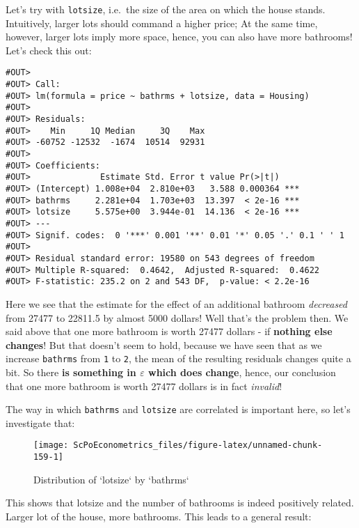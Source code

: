 \documentclass[]{book}
\begin{document}
Let's try with \texttt{lotsize}, i.e.~the size of the area on which the
house stands. Intuitively, larger lots should command a higher price; At
the same time, however, larger lots imply more space, hence, you can
also have more bathrooms! Let's check this out:

\begin{verbatim}
#OUT> 
#OUT> Call:
#OUT> lm(formula = price ~ bathrms + lotsize, data = Housing)
#OUT> 
#OUT> Residuals:
#OUT>    Min     1Q Median     3Q    Max 
#OUT> -60752 -12532  -1674  10514  92931 
#OUT> 
#OUT> Coefficients:
#OUT>              Estimate Std. Error t value Pr(>|t|)    
#OUT> (Intercept) 1.008e+04  2.810e+03   3.588 0.000364 ***
#OUT> bathrms     2.281e+04  1.703e+03  13.397  < 2e-16 ***
#OUT> lotsize     5.575e+00  3.944e-01  14.136  < 2e-16 ***
#OUT> ---
#OUT> Signif. codes:  0 '***' 0.001 '**' 0.01 '*' 0.05 '.' 0.1 ' ' 1
#OUT> 
#OUT> Residual standard error: 19580 on 543 degrees of freedom
#OUT> Multiple R-squared:  0.4642,  Adjusted R-squared:  0.4622 
#OUT> F-statistic: 235.2 on 2 and 543 DF,  p-value: < 2.2e-16
\end{verbatim}

Here we see that the estimate for the effect of an additional bathroom
\emph{decreased} from 27477 to 22811.5 by almost 5000 dollars! Well
that's the problem then. We said above that one more bathroom is worth
27477 dollars - if \textbf{nothing else changes}! But that doesn't seem
to hold, because we have seen that as we increase \texttt{bathrms} from
\texttt{1} to \texttt{2}, the mean of the resulting residuals changes
quite a bit. So there \textbf{is something in \(\varepsilon\) which does
change}, hence, our conclusion that one more bathroom is worth 27477
dollars is in fact \emph{invalid}!

The way in which \texttt{bathrms} and \texttt{lotsize} are correlated is
important here, so let's investigate that:

\begin{figure}

{\centering \texttt{[image: ScPoEconometrics\_files/figure-latex/unnamed-chunk-159-1]} 

}

\caption{Distribution of `lotsize` by `bathrms`}\label{fig:unnamed-chunk-159}
\end{figure}

This shows that lotsize and the number of bathrooms is indeed positively
related. Larger lot of the house, more bathrooms. This leads to a
general result:
\end{document}
